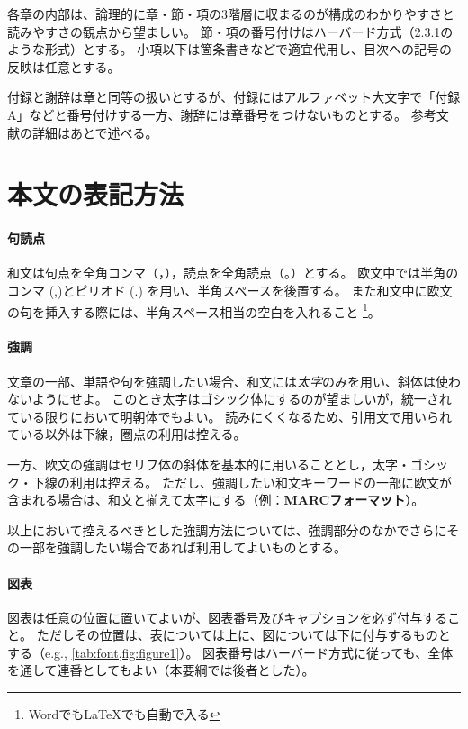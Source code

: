     各章の内部は、論理的に章・節・項の3階層に収まるのが構成のわかりやすさと読みやすさの観点から望ましい。
    節・項の番号付けはハーバード方式（2.3.1のような形式）とする。
    小項以下は箇条書きなどで適宜代用し、目次への記号の反映は任意とする。

    付録と謝辞は章と同等の扱いとするが、付録にはアルファベット大文字で「付録A」などと番号付けする一方、謝辞には章番号をつけないものとする。
    参考文献の詳細はあとで述べる。

  \section{本文の表記方法}
		\label{sec:writing_manner}

	  \paragraph{句読点}
			\label{par:punct}

		  和文は句点を全角コンマ（，），読点を全角読点（。）とする。
		  欧文中では半角のコンマ (,)とピリオド (.) を用い、半角スペースを後置する。
		  また和文中に欧文の句を挿入する際には、半角スペース相当の空白を入れること
      \footnote{WordでもLaTeXでも自動で入る}。

	  \paragraph{強調}
			\label{par:inline_markup}

			文章の一部、単語や句を強調したい場合、和文には\emph{太字}のみを用い、斜体は使わないようにせよ。
		  このとき太字はゴシック体にするのが望ましいが，統一されている限りにおいて明朝体でもよい。
		  読みにくくなるため、引用文で用いられている以外は下線，圏点の利用は控える。

		  一方、欧文の強調はセリフ体の斜体を基本的に用いることとし，太字・ゴシック・下線の利用は控える。
		  ただし、強調したい和文キーワードの一部に欧文が含まれる場合は、和文と揃えて太字にする（例：\textbf{MARCフォーマット}）。

			以上において控えるべきとした強調方法については、強調部分のなかでさらにその一部を強調したい場合であれば利用してよいものとする。

	  \paragraph{図表}
			\label{par:fig_tab}

		  図表は任意の位置に置いてよいが、図表番号及びキャプションを必ず付与すること。
			ただしその位置は、表については上に、図については下に付与するものとする（e.g., \cref{tab:font,fig:figure1}）。
			図表番号はハーバード方式に従っても、全体を通して連番としてもよい（本要綱では後者とした）。

